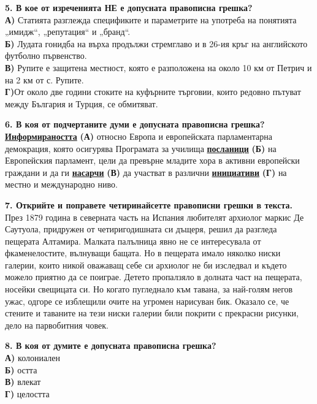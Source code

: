 \documentclass[12pt,a4paper]{article}
\begin{document}
\vspace{0.6cm}

\noindent
\textbf{5. В кое от изреченията НЕ е допусната правописна грешка?} \\
\noindent
\textbf{А)} Статията разглежда спецификите и параметрите на употреба на понятията „имидж“, „репутация“ и „бранд“. \\
\textbf{Б)} Лудата гонидба на върха продължи стремглаво и в 26-ия кръг на английското футболно първенство. \\
\textbf{В)} Рупите е защитена местност, която е разположена на около 10 км от Петрич и на 2 км от с. Рупите. \\
\textbf{Г)}От около две години стоките на куфърните търговии, които редовно пътуват между България и Турция, се обмитяват.

\vspace{0.6cm}

\noindent
\textbf{6. В коя от подчертаните думи е допусната правописна грешка?} \\
\noindent
\underline{\textbf{Информираността}} \textbf{(А)} относно Европа и европейската парламентарна демокрация, която осигурява Програмата за училища \underline{\textbf{посланици}} \textbf{(Б)} на Европейския парламент, цели да превърне младите хора в активни европейски граждани и да ги \underline{\textbf{насарчи}} \textbf{(В)} да участват в различни \underline{\textbf{инициативи}} \textbf{(Г)} на местно и международно ниво.

\vspace{0.6cm}

\noindent
\textbf{7. Открийте и поправете четиринайсетте правописни грешки в текста.} \\
\noindent
През 1879 година в северната часть на Испания любителят архиолог маркис Де Саутуола, придружен от четиригодишната си дъщеря, решил да разгледа пещерата Алтамира. Малката палълница явно не се интересувала от фкаменелостите, вълнуващи бащата. Но в пещерата имало няколко ниски галерии, които никой оважаващ себе си архиолог не би изследвал и където можело приятно да се поиграе. Детето пропалзяло в долната част на пещерата, носейки свещицата си. Но когато пугледнало към тавана, за най-голям негов ужас, одгоре се изблещили очите на угромен нарисуван бик. Оказало се, че стените и таваните на тези ниски галерии били покрити с прекрасни рисунки, дело на парвобитния човек.

\vspace{0.6cm}

\noindent
\textbf{8. В коя от думите е допусната правописна грешка?} \\
\noindent
\textbf{А)} колониален \\
\textbf{Б)} остта \\
\textbf{В)} влекат \\
\textbf{Г)} целостта
\end{document}
